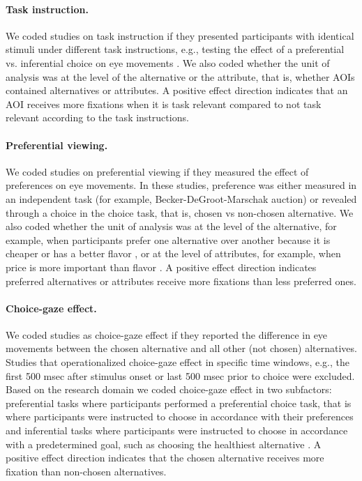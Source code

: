 \paragraph{Task instruction.} We coded studies on task instruction if they presented participants with identical stimuli under different task instructions, e.g., testing the effect of a preferential  vs. inferential choice on eye movements \citep{orquin2019a}. We also coded whether the unit of analysis was at the level of the alternative or the attribute, that is, whether AOIs contained alternatives or attributes. A positive effect direction indicates that an AOI receives more fixations when it is task relevant compared to not task relevant according to the task instructions.

\paragraph{Preferential viewing.} We coded studies on preferential viewing if they measured the effect of preferences on eye movements. In these studies, preference was either measured in an independent task (for example, Becker-DeGroot-Marschak auction) or revealed through a choice in the choice task, that is, chosen vs non-chosen alternative. We also coded whether the unit of analysis was at the level of the alternative, for example, when participants prefer one alternative over another because it is cheaper or has a better flavor \citep{gidloef2017a}, or at the level of attributes, for example, when price is more important than flavor \citep{meissner2016a}. A positive effect direction indicates preferred alternatives or attributes receive more fixations than less preferred ones.

\paragraph{Choice-gaze effect.} We coded studies as choice-gaze effect if they reported the difference in eye movements between the chosen alternative and all other (not chosen) alternatives. Studies that operationalized choice-gaze effect in specific time windows, e.g., the first 500 msec after stimulus onset or last 500 msec prior to choice \citep{shimojo2003a} were excluded. Based on the research domain we coded choice-gaze effect in two subfactors: preferential tasks where participants performed a preferential choice task, that is where participants were instructed to choose in accordance with their preferences \citep{schotter2010a} and inferential tasks where participants were instructed to choose in accordance with a predetermined goal, such as choosing the healthiest alternative \citep{schotter2012a}. A positive effect direction indicates that the chosen alternative receives more fixation than non-chosen alternatives.

